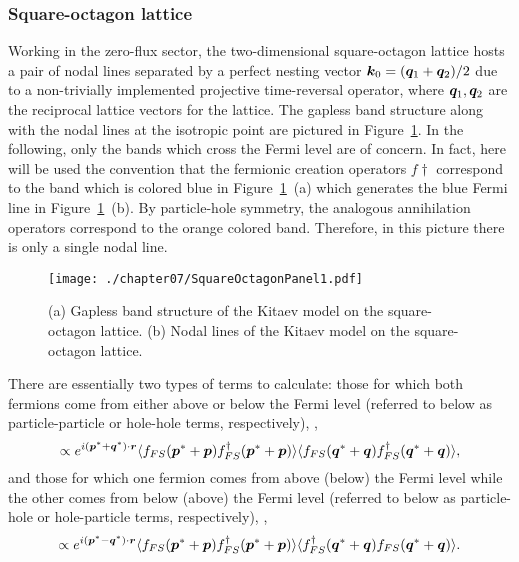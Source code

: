 \subsubsection{Square-octagon lattice}
\label{section:chapter07_BondBondSquareOctagon}
%
%
Working in the zero-flux sector, the two-dimensional square-octagon lattice hosts a pair of nodal lines separated by a perfect nesting vector $\bm{k}_0 = (\bm{q}_1 + \bm{q}_2)/2$ due to a non-trivially implemented projective time-reversal operator, where $\bm{q}_1, \bm{q}_2$ are the reciprocal lattice vectors for the lattice.
The gapless band structure along with the nodal lines at the isotropic point are pictured in Figure~\ref{fig:chapter07_SquareOctagonPanel1}.
In the following, only the bands which cross the Fermi level are of concern.
In fact, here will be used the convention that the fermionic creation operators $f\dag$ correspond to the band which is colored blue in Figure~\ref{fig:chapter07_SquareOctagonPanel1}~(a) which generates the blue Fermi line in Figure~\ref{fig:chapter07_SquareOctagonPanel1}~(b).
By particle-hole symmetry, the analogous annihilation operators correspond to the orange colored band.
Therefore, in this picture there is only a single nodal line.
%
\begin{figure}[tb]
	\centering
	\texttt{[image: ./chapter07/SquareOctagonPanel1.pdf]}
	\caption{
		(a) Gapless band structure of the Kitaev model on the square-octagon lattice.
		(b) Nodal lines of the Kitaev model on the square-octagon lattice.
	}
	\label{fig:chapter07_SquareOctagonPanel1}
\end{figure}
%

There are essentially two types of terms to calculate: those for which both fermions come from either above or below the Fermi level (referred to below as particle-particle or hole-hole terms, respectively), \ie,
%
\begin{equation}
	\propto e^{i (\bm{p}^* + \bm{q}^*) \cdot \bm{r}} \langle f_{FS}(\bm{p}^* + \bm{p}) f^{\dagger}_{FS}(\bm{p}^* + \bm{p}) \rangle \langle f_{FS}(\bm{q}^* + \bm{q}) f^{\dagger}_{FS}(\bm{q}^* + \bm{q}) \rangle,
\end{equation}
%
and those for which one fermion comes from above (below) the Fermi level while the other comes from below (above) the Fermi level (referred to below as particle-hole or hole-particle terms, respectively), \ie,
%
\begin{equation}
	\propto e^{i (\bm{p}^* - \bm{q}^*) \cdot \bm{r}} \langle f_{FS}(\bm{p}^* + \bm{p}) f^{\dagger}_{FS}(\bm{p}^* + \bm{p}) \rangle \langle f^{\dagger}_{FS}(\bm{q}^* + \bm{q}) f_{FS}(\bm{q}^* + \bm{q}) \rangle.
\end{equation}
%

